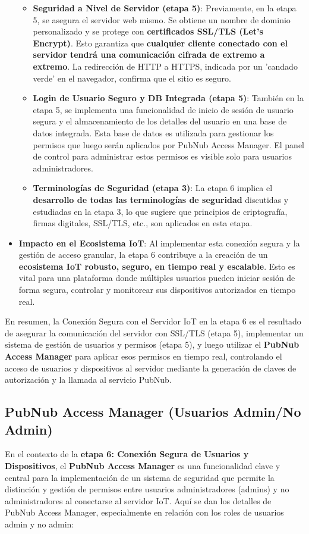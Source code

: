 \documentclass{report}
\begin{document}
\begin{itemize}
\begin{itemize}
        \item \textbf{Seguridad a Nivel de Servidor (etapa 5)}: Previamente, en la etapa 5, se asegura el servidor web mismo. Se obtiene un nombre 
        de dominio personalizado y se protege con \textbf{certificados SSL/TLS (Let's Encrypt)}. Esto garantiza que \textbf{cualquier cliente conectado 
        con el servidor tendrá una comunicación cifrada de extremo a extremo}. La redirección de HTTP a HTTPS, indicada por un  'candado verde' en el 
        navegador, confirma que el sitio es seguro.
        \item \textbf{Login de Usuario Seguro y DB Integrada (etapa 5)}: También en la etapa 5, se implementa una funcionalidad de inicio de sesión 
        de usuario segura y el almacenamiento de los detalles del usuario en una base de datos integrada. Esta base de datos es utilizada para gestionar 
        los permisos que luego serán aplicados por PubNub Access Manager. El panel de control para administrar estos permisos es visible solo para usuarios 
        administradores.
        \item \textbf{Terminologías de Seguridad (etapa 3)}: La etapa 6 implica el \textbf{desarrollo de todas las terminologías de seguridad} 
        discutidas y estudiadas en la etapa 3, lo que sugiere que principios de criptografía, firmas digitales, SSL/TLS, etc., son aplicados en esta etapa.
    \end{itemize}
    \item \textbf{Impacto en el Ecosistema IoT}: Al implementar esta conexión segura y la gestión de acceso granular, la etapa 6 contribuye a la 
    creación de un \textbf{ecosistema IoT robusto, seguro, en tiempo real y escalable}. Esto es vital para una plataforma donde múltiples usuarios 
    pueden iniciar sesión de forma segura, controlar y monitorear sus dispositivos autorizados en tiempo real.
\end{itemize}
En resumen, la Conexión Segura con el Servidor IoT en la etapa 6 es el resultado de asegurar la comunicación del servidor con SSL/TLS (etapa 5), 
implementar un sistema de gestión de usuarios y permisos (etapa 5), y luego utilizar el \textbf{PubNub Access Manager} para aplicar esos permisos 
en tiempo real, controlando el acceso de usuarios y dispositivos al servidor mediante la generación de claves de autorización y la llamada al servicio PubNub.

\subsection{PubNub Access Manager (Usuarios Admin/No Admin)}
En el contexto de la \textbf{etapa 6: Conexión Segura de Usuarios y Dispositivos}, el \textbf{PubNub Access Manager} es una funcionalidad clave y 
central para la implementación de un sistema de seguridad que permite la distinción y gestión de permisos entre usuarios administradores (admins) y 
no administradores al conectarse al servidor IoT. Aquí se dan los detalles de PubNub Access Manager, especialmente en relación con los roles de 
usuarios admin y no admin:
\end{document}

